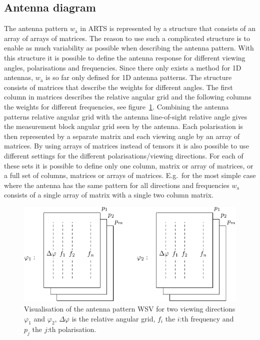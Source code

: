 \subsection{Antenna diagram}
\label{sec:sensor:antenna:diagram}
The antenna pattern $w_\mathrm{a}$ in ARTS is represented by a structure  that consists of an array of arrays of matrices. The reason to use such a complicated structure is to enable as much variability as possible when describing the antenna pattern. With this structure it is possible to define the antenna response for different viewing angles, polarisations and frequencies. 
Since there only exists a method for 1D antennas, $w_\mathrm{a}$ is so far only defined for 1D antenna patterns. The structure consists of matrices that describe the weights for different angles. The first column in matrices describes the relative angular grid and the following columns the weights for different frequencies, see figure~\ref{fig:sensor:ant_diag}. Combining the antenna patterns relative angular grid with the antenna line-of-sight relative angle gives the measurement block angular grid seen by the antenna. Each polarisation is then represented by a separate matrix and each viewing angle by an array of matrices. By using arrays of matrices instead of tensors it is also possible to use different settings for the different polarisations/viewing directions. For each of these sets it is possible to define only one column, matrix or array of matrices, or a full set of columns, matrices or arrays of matrices. E.g.~for the most simple case where the antenna has the same pattern for all directions and frequencies $w_\mathrm{a}$ consists of a single array of matrix with a single two column matrix.
\begin{figure}[!ht]
\label{fig:sensor:ant_diag}
\begin{center}
  \includegraphics*{Figs/sensor/ant_diag}
  \caption{Visualisation of the antenna pattern WSV  for   
  two viewing directions $\varphi_1$ and $\varphi_2$, $\Delta\varphi$ is the relative   
  angular grid, $f_i$ the $i$:th frequency and $p_j$ the $j$:th polarisation.}
\end{center}
\end{figure}

